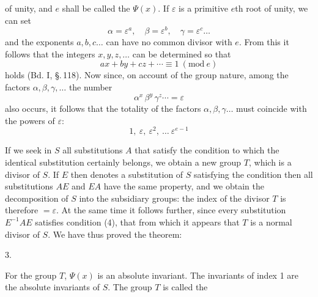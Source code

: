 of unity, and $e$ shall be called the  $\mathit\Psi(x)$.
If $\varepsilon$ is a primitive $e$th root of unity, we can set
\[
\alpha=\varepsilon^a,\quad \beta=\varepsilon^b,\quad \gamma=\varepsilon^c \ldots
\]
and the exponents $a,b,c\ldots$ can have no common
divisor with $e$. From this it follows that the
integers $x,y,z,\ldots$ can be determined so that
\[
ax+by+cz+\cdots \equiv 1\ (\mathrm{mod}\ e)
\]
holds (Bd. I, \S.\,118). Now since, on account of the group nature, among
the factors $\alpha,\beta,\gamma,\ldots$ the number
\[
\alpha^x\,\beta^y\,\gamma^z \cdots = \varepsilon
\]
also occurs, it follows that the totality of the factors $\alpha,\beta,\gamma\ldots$
must coincide with the powers of $\varepsilon$:
\[
1,\ \varepsilon,\ \varepsilon^2,\ \ldots\ \varepsilon^{e-1}
\]

If we seek in $S$ all substitutions $A$ that satisfy the condition
to which the identical substitution certainly belongs, we
obtain a new group $T$, which is a divisor of $S$.
If $E$ then denotes a substitution of $S$ satisfying the condition
then all substitutions $AE$
and $EA$ have the same property, and we obtain the decomposition
of $S$ into the subsidiary groups:
the index of the divisor $T$ is therefore $=\varepsilon$. %
At the same time it follows further, since every substitution $E^{-1}AE$ satisfies condition (4), that
from which it appears that $T$ is a normal divisor of $S$. We
have thus proved the theorem:

3. 

For the group $T$, $\mathit\Psi(x)$ is an absolute invariant. The invariants
 of index 1 are the absolute invariants of $S$.
The group $T$ is called the 
